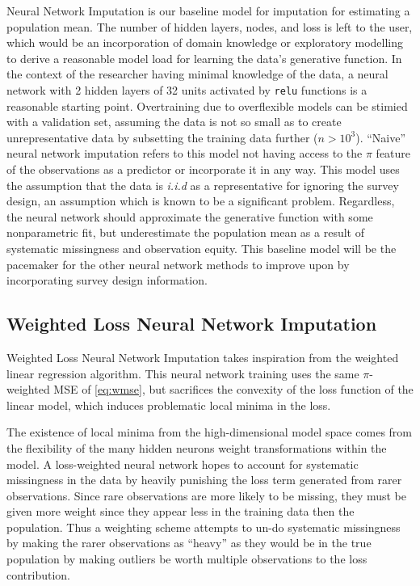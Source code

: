 \documentclass[12pt,twoside]{reedthesis}
\begin{document}
Neural Network Imputation is our baseline model for imputation for
estimating a population mean. The number of hidden layers, nodes, and
loss is left to the user, which would be an incorporation of domain
knowledge or exploratory modelling to derive a reasonable model load for
learning the data's generative function. In the context of the
researcher having minimal knowledge of the data, a neural network with 2
hidden layers of 32 units activated by \texttt{relu} functions is a
reasonable starting point. Overtraining due to overflexible models can
be stimied with a validation set, assuming the data is not so small as
to create unrepresentative data by subsetting the training data further
(\(n > 10^3\)). ``Naive'' neural network imputation refers to this model
not having access to the \(\pi\) feature of the observations as a
predictor or incorporate it in any way. This model uses the assumption
that the data is \emph{i.i.d} as a representative for ignoring the
survey design, an assumption which is known to be a significant problem.
Regardless, the neural network should approximate the generative
function with some nonparametric fit, but underestimate the population
mean as a result of systematic missingness and observation equity. This
baseline model will be the pacemaker for the other neural network
methods to improve upon by incorporating survey design information.

\subsection{Weighted Loss Neural Network
Imputation}\label{weighted-loss-neural-network-imputation}

Weighted Loss Neural Network Imputation takes inspiration from the
weighted linear regression algorithm. This neural network training uses
the same \(\pi\)-weighted MSE of \eqref{eq:wmse}, but sacrifices the
convexity of the loss function of the linear model, which induces
problematic local minima in the loss.

The existence of local minima from the high-dimensional model space
comes from the flexibility of the many hidden neurons weight
transformations within the model. A loss-weighted neural network hopes
to account for systematic missingness in the data by heavily punishing
the loss term generated from rarer observations. Since rare observations
are more likely to be missing, they must be given more weight since they
appear less in the training data then the population. Thus a weighting
scheme attempts to un-do systematic missingness by making the rarer
observations as ``heavy'' as they would be in the true population by
making outliers be worth multiple observations to the loss contribution.
\end{document}

